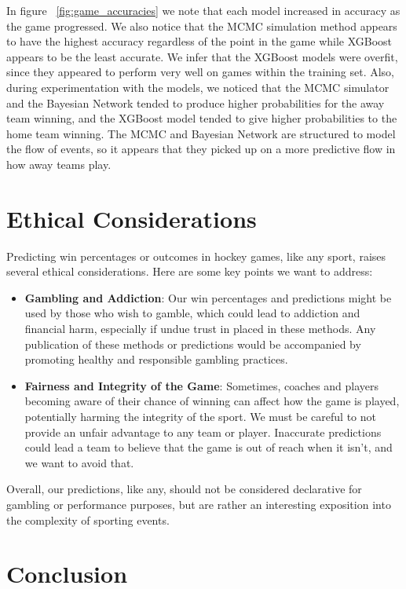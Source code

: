 \documentclass[11pt]{article}
\begin{document}
In figure ~\ref{fig:game_accuracies} we note that each model increased in accuracy as the game progressed. We also notice that the MCMC simulation method appears to have the highest accuracy regardless of the point in the game while XGBoost appears to be the least accurate. We infer that the XGBoost models were overfit, since they appeared to perform very well on games within the training set. Also, during experimentation with the models, we noticed that the MCMC simulator and the Bayesian Network tended to produce higher probabilities for the away team winning, and the XGBoost model tended to give higher probabilities to the home team winning. The MCMC and Bayesian Network are structured to model the flow of events, so it appears that they picked up on a more predictive flow in how away teams play.

\section{Ethical Considerations}
Predicting win percentages or outcomes in hockey games, like any sport, raises several ethical considerations. Here are some key points we want to address:

\begin{itemize}[label=\textbullet]
\item \textbf{Gambling and Addiction}:
Our win percentages and predictions might be used by those who wish to gamble, which could lead to addiction and financial harm, especially if undue trust in placed in these methods. Any publication of these methods or predictions would be accompanied by promoting healthy and responsible gambling practices.
    
\item \textbf{Fairness and Integrity of the Game}:
Sometimes, coaches and players becoming aware of their chance of winning can affect how the game is played, potentially harming the integrity of the sport. We must be careful to not provide an unfair advantage to any team or player.
Inaccurate predictions could lead a team to believe that the game is out of reach when it isn't, and we want to avoid that.
            
\end{itemize}

Overall, our predictions, like any, should not be considered declarative for gambling or performance purposes, but are rather an interesting exposition into the complexity of sporting events.


\section{Conclusion}
\end{document}
